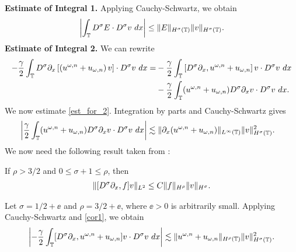\textbf{Estimate of Integral 1.} Applying Cauchy-Schwartz, we obtain
%
%
\begin{equation}
\begin{split}
\left |\int_{\mathbb{T}} D^\sigma E \cdot D^\sigma v \ dx \right |
\le \|E\|_{H^\sigma(\mathbb{T})} \|v\|_{H^\sigma(\mathbb{T})}.
\label{est_for_1}
\end{split}
\end{equation}
%
%
%
\textbf{Estimate of Integral 2.} We can rewrite
%
%
\begin{equation}
\begin{split}
-\frac{\gamma}{2} \int_{\mathbb{T}} D^\sigma \partial_x \left[ \left( u^{\omega,n} + 
u_{\omega,n}
\right)v \right] \cdot D^\sigma v \ dx
= & -\frac{\gamma}{2}\int_{\mathbb{T}} \left[ D^\sigma \partial_x , u^{\omega,n} + 
u_{\omega,n}
\right]v \cdot D^\sigma v \ dx
\\
& - \frac{\gamma}{2} \int_{\mathbb{T}} (u^{\omega,n} + u_{\omega,n})
D^\sigma \partial_x v \cdot
D^\sigma v \ dx.
\label{est_for_2}
\end{split}
\end{equation}
%
%
We now estimate \eqref{est_for_2}. Integration 
by parts and Cauchy-Schwartz gives 
%
%
\begin{equation}
\begin{split}
\left | \frac{\gamma}{2} \int_{\mathbb{T}} (u^{\omega,n} + u_{\omega,n})
D^\sigma \partial_x v \cdot
D^\sigma v \ dx \right |
& \lesssim \|\partial_x(u^{\omega,n} + u_{\omega,n}) \|_{L^\infty(\mathbb{T})}
\|v\|_{H^\sigma(\mathbb{T})}^2.
\label{2'}
\end{split}
\end{equation}
%
%
We now need the following result
taken from \cite{Himonas_2009_Non-uniform-dep-per}:
%
\begin{lemma}
\label{cor1}
If $\rho > 3/2$ and $0 \le \sigma + 1 \le \rho$, then
%
%
\begin{equation}
\begin{split}
\|[D^\sigma \partial_x ,f]v\|_{L^2} \le C \|f\|_{H^\rho} \|v\|_{H^\sigma}.
\label{15}
\end{split}
\end{equation}
%
%
\end{lemma}
%
Let $\sigma = 1/2 + \ee$ and $\rho = 3/2 + \ee$, where 
$\ee > 0$ is
arbitrarily small. Applying Cauchy-Schwartz and \cref{cor1}, we obtain 
%
%
%
%
%
\begin{equation}
\begin{split}
\left | -\frac{\gamma}{2} \int_{\mathbb{T}} [D^\sigma \partial_x , u^{\omega,n} + 
u_{\omega,n}]v
\cdot D^\sigma v \ dx \right | \lesssim \|u^{\omega,n} +
u_{\omega,n}\|_{H^{\rho}(\mathbb{T})} \|v\|_{H^\sigma(\mathbb{T})}^2.
\label{7}
\end{split}
\end{equation}
